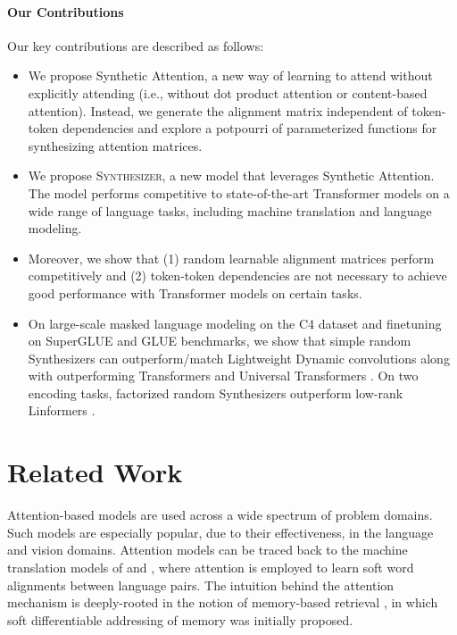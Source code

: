 \documentclass{article}
\begin{document}
\paragraph{Our Contributions}
Our key contributions are described as follows:
\begin{itemize}
\item We propose Synthetic Attention, a new way of learning to attend without explicitly attending (i.e., without dot product attention or content-based attention). Instead, we generate the alignment matrix independent of token-token dependencies and explore a potpourri of parameterized functions for synthesizing attention matrices. 
\item We propose \textsc{Synthesizer}, a new model that leverages Synthetic Attention. The model performs competitive to state-of-the-art Transformer models on a wide range of language tasks, including machine translation and language modeling. 
\item Moreover, we show that (1) random learnable alignment matrices perform competitively and (2) token-token dependencies are not necessary to achieve good performance with Transformer models on certain tasks. 
\item On large-scale masked language modeling on the C4 dataset \citep{raffel2019exploring} and finetuning on SuperGLUE and GLUE benchmarks, we show that simple random Synthesizers can outperform/match Lightweight Dynamic convolutions \citep{wu2019pay} along with outperforming Transformers and Universal Transformers \citep{dehghani2018universal}. On two encoding tasks, factorized random Synthesizers outperform low-rank Linformers \citep{wang2020linformer}.
\end{itemize}

\section{Related Work}
Attention-based models are used across a wide spectrum of problem domains. Such models are especially popular, due to their effectiveness, in the language and vision domains. Attention models can be traced back to the machine translation models of \citep{bahdanau2014neural} and \citep{luong2015effective}, where attention is employed to learn soft word alignments between language pairs. The intuition behind the attention mechanism is deeply-rooted in the notion of memory-based retrieval \citep{graves2014neural,weston2014memory}, in which soft differentiable addressing of memory was initially proposed. 
\end{document}
